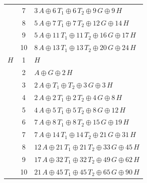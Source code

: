 \documentclass[11pt]{article}
\begin{document}
\begin{longtable}{l c p{}}
 & 7 & $3\,A\oplus 6\,T_{1}\oplus 6\,T_{2}\oplus 9\,G\oplus 9\,H$\\
 & 8 & $5\,A\oplus 7\,T_{1}\oplus 7\,T_{2}\oplus 12\,G\oplus 14\,H$\\
 & 9 & $5\,A\oplus 11\,T_{1}\oplus 11\,T_{2}\oplus 16\,G\oplus 17\,H$\\
 & 10 & $8\,A\oplus 13\,T_{1}\oplus 13\,T_{2}\oplus 20\,G\oplus 24\,H$\\
\hline
$H$ & 1 & $H$\\
 & 2 & $A\oplus G\oplus 2\,H$\\
 & 3 & $2\,A\oplus T_{1}\oplus T_{2}\oplus 3\,G\oplus 3\,H$\\
 & 4 & $2\,A\oplus 2\,T_{1}\oplus 2\,T_{2}\oplus 4\,G\oplus 8\,H$\\
 & 5 & $4\,A\oplus 5\,T_{1}\oplus 5\,T_{2}\oplus 8\,G\oplus 12\,H$\\
 & 6 & $7\,A\oplus 8\,T_{1}\oplus 8\,T_{2}\oplus 15\,G\oplus 19\,H$\\
 & 7 & $7\,A\oplus 14\,T_{1}\oplus 14\,T_{2}\oplus 21\,G\oplus 31\,H$\\
 & 8 & $12\,A\oplus 21\,T_{1}\oplus 21\,T_{2}\oplus 33\,G\oplus 45\,H$\\
 & 9 & $17\,A\oplus 32\,T_{1}\oplus 32\,T_{2}\oplus 49\,G\oplus 62\,H$\\
 & 10 & $21\,A\oplus 45\,T_{1}\oplus 45\,T_{2}\oplus 65\,G\oplus 90\,H$\\
\hline
\end{longtable}
\end{document}
